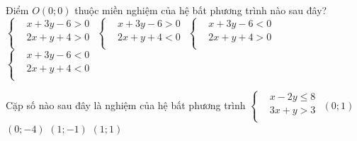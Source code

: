 \begin{ex}%
	Điểm $O(0;0)$ thuộc miền nghiệm của hệ bất phương trình nào sau đây?
	\choice
	{$ \left\{\begin{aligned}
			&x+3y-6>0\\
			&2x+y+4>0\\
		\end{aligned}\right.$}
	{$ \left\{\begin{aligned}
			&x+3y-6>0\\
			&2x+y+4<0\\
		\end{aligned}\right.$}
	{\True $ \left\{\begin{aligned}
			&x+3y-6<0\\
			&2x+y+4>0\\
		\end{aligned}\right.$}
	{$ \left\{\begin{aligned}
			&x+3y-6<0\\
			&2x+y+4<0\\
		\end{aligned}\right.$}
\end{ex}
\begin{ex}%
	Cặp số nào sau đây là nghiệm của hệ bất phương trình $ \left\{\begin{aligned}
		&x-2y \leq 8\\
		&3x+y>3\\
	\end{aligned}\right.$
	\choice
	{$(0;1)$}
	{$(0;-4)$}
	{$(1;-1)$}
	{\True $(1;1)$}
\end{ex}
